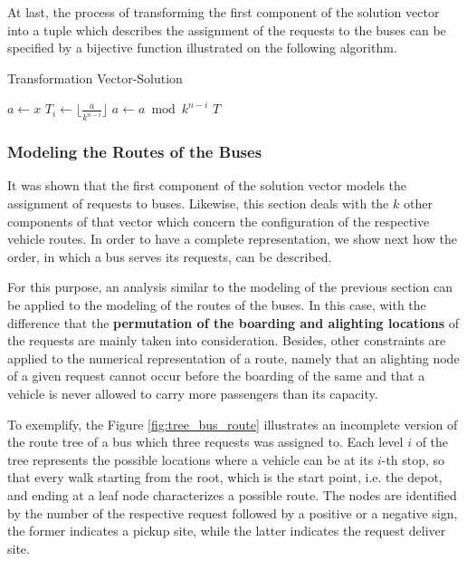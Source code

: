 \documentclass[tuberlin,cic,tc,openright,english,noabntcite,oneside]{iiufrgs}
\begin{document}
At last, the process of transforming the first component of the solution vector into a tuple which describes the assignment of the requests to the buses can be specified by a bijective function illustrated on the following algorithm.
\begin{algorithm}[H]
\caption{Transformation Vector-Solution}
\begin{algorithmic}
\State $a \gets x$
	\State $\displaystyle T_{i} \gets \lfloor \frac{a}{k^{n-i}} \rfloor$
	\State $a \gets a \bmod k^{n-i}$
\EndFor
\State \Return $T$
\EndFunction
\end{algorithmic}
\end{algorithm}

\subsubsection{Modeling the Routes of the Buses}
It was shown that the first component of the solution vector models the assignment of requests to buses. Likewise, this section deals with the $k$ other components of that vector which concern the configuration of the respective vehicle routes. In order to have a complete representation, we show next how the order, in which a bus serves its requests, can be described.

For this purpose, an analysis similar to the modeling of the previous section can be applied to the modeling of the routes of the buses. In this case, with the difference that the \textbf{permutation of the boarding and alighting locations} of the requests are mainly taken into consideration. Besides, other constraints are applied to the numerical representation of a route, namely that an alighting node of a given request cannot occur before the boarding of the same and that a vehicle is never allowed to carry more passengers than its capacity.

To exemplify, the Figure \ref{fig:tree_bus_route} illustrates an incomplete version of the route tree of a bus which three requests was assigned to. Each level $i$ of the tree represents the possible locations where a vehicle can be at its $i$-th stop, so that every walk starting from the root, which is the start point, i.e. the depot, and ending at a leaf node characterizes a possible route. The nodes are identified by the number of the respective request followed by a positive or a negative sign, the former indicates a pickup site, while the latter indicates the request deliver site.
\end{document}
